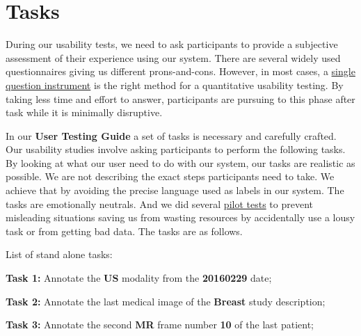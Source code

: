 \section{Tasks}

During our usability tests, we need to ask participants to provide a subjective assessment of their experience using our system. There are several widely used questionnaires giving us different prons-and-cons. However, in most cases, a \hyperlink{https://www.nngroup.com/articles/keep-online-surveys-short/}{single question instrument} \cite{sauro201210} is the right method for a quantitative usability testing. By taking less time and effort to answer, participants are pursuing to this phase after task while it is minimally disruptive.

In our \textbf{User Testing Guide} a set of tasks is necessary and carefully crafted. Our usability studies involve asking participants to perform the following tasks. By looking at what our user need to do with our system, our tasks are realistic as possible. We are not describing the exact steps participants need to take. We achieve that by avoiding the precise language used as labels in our system. The tasks are emotionally neutrals. And we did several \hyperlink{https://www.nngroup.com/articles/pilot-testing/}{pilot tests} to prevent misleading situations saving us from wasting resources by accidentally use a lousy task or from getting bad data. The tasks are as follows.

\hfill

List of stand alone tasks:

\hfill

\textbf{Task 1:} Annotate the \textbf{US} modality from the \textbf{20160229} date;

\hfill

\textbf{Task 2:} Annotate the last medical image of the \textbf{Breast} study description;

\hfill

\textbf{Task 3:} Annotate the second \textbf{MR} frame number \textbf{10} of the last patient;

\hfill

\clearpage
